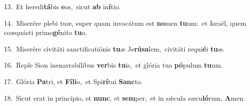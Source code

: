 {\numbfont\textcolor{\numbcolor}{13.}}~Et heredi\-\textbf{tá}\-bis \textbf{e}\-os,~\star sicut \textbf{ab} in\-\textbf{í}\-tio.\par
{\numbfont\textcolor{\numbcolor}{14.}}~Miserére plebi tuæ, super quam invocátum est \textbf{no}\-men \textbf{tu}\-um:~\star et Israël, quem coæquásti primo\-\textbf{gé}\-nito \textbf{tu}\-o.\par
{\numbfont\textcolor{\numbcolor}{15.}}~Miserére civitáti sanctificatiónis \textbf{tu}\-æ Je\-\textbf{rú}\-\textbf{sa}lem,~\star civitáti requi\-\textbf{é}\-i \textbf{tu}\-æ.\par
{\numbfont\textcolor{\numbcolor}{16.}}~Reple Sion inenarrabílibus \textbf{ver}\-bis \textbf{tu}\-is,~\star et glória tua \textbf{pó}\-pulum \textbf{tu}\-um.\par
{\numbfont\textcolor{\numbcolor}{17.}}~Glória \textbf{Pa}\-tri, et \textbf{Fí}\-\textbf{li}o,~\star et Spi\-\textbf{rí}\-tui \textbf{Sanc}\-to.\par
{\numbfont\textcolor{\numbcolor}{18.}}~Sicut erat in princípio, et \textbf{nunc}\-, et \textbf{sem}\-per,~\star et in sǽcula sæcu\-\textbf{ló}\-rum. \textbf{A}\-men.\par
